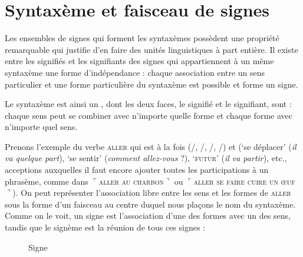\section{Syntaxème et faisceau de signes}\label{sec:2.3.17}

Les ensembles de signes qui forment les syntaxèmes possèdent une propriété remarquable qui justifie d’en faire des unités linguistiques à part entière. Il existe entre les signifiés et les signifiants des signes qui appartiennent à un même syntaxème une forme d’indépendance : chaque association entre un sens particulier et une forme particulière du syntaxème est possible et forme un signe.

{Le syntaxème est ainsi un , dont les deux faces, le signifié et le signifiant, sont : chaque sens peut se combiner avec n’importe quelle forme et chaque forme avec n’importe quel sens.}

Prenons l’exemple du verbe \textsc{aller} qui est à la fois  (/, /, /, /) et  (‘se déplacer’ (\textit{il va quelque part}), ‘se sentir’ (\textit{comment allez-vous} ?), ‘\textsc{futur}’ (\textit{il va partir}), etc., acceptions auxquelles il faut encore ajouter toutes les participations à un phrasème, comme dans $⌜$\textsc{aller} \textsc{au} \textsc{charbon}$⌝$ ou $⌜$\textsc{aller} \textsc{se} \textsc{faire} \textsc{cuire} \textsc{un} \textsc{œuf}$⌝$). On peut représenter l’association libre entre les sens et les formes de \textsc{aller} sous la forme d’un faisceau au centre duquel nous plaçons le nom du syntaxème. Comme on le voit, un signe est l’association d’une des formes avec un des sens, tandis que le signème est la réunion de tous ces signes :

\begin{figure}
\caption{Signe\label{fig:}}
\end{figure}

